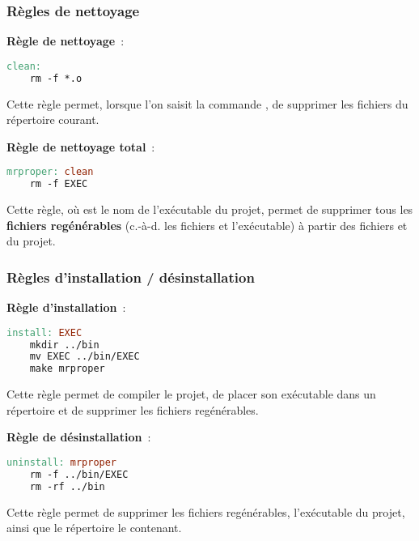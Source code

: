 \begin{frame}[fragile]
\frametitle{Règles de nettoyage}
{\bf Règle de nettoyage}~:
\begin{multicols}{2}
\begin{lstlisting}[language=make]
clean:
    rm -f *.o
\end{lstlisting}
Cette règle permet, lorsque l'on saisit la commande ,
de supprimer les fichiers  du répertoire courant.
\end{multicols}
\bigskip
\bigskip

{\bf Règle de nettoyage total}~:
\begin{multicols}{2}
\begin{lstlisting}[language=make]
mrproper: clean
    rm -f EXEC
\end{lstlisting}
Cette règle,
où  est le nom de l'exécutable du projet, permet de supprimer
tous les {\bf fichiers regénérables} (c.-à-d. les fichiers  et
l'exécutable) à partir des fichiers  et  du projet.
\end{multicols}
\end{frame}

\begin{frame}[fragile]
\frametitle{Règles d'installation / désinstallation}

{\bf Règle d'installation}~:
\begin{multicols}{2}
\begin{lstlisting}[language=make]
install: EXEC
    mkdir ../bin
    mv EXEC ../bin/EXEC
    make mrproper
\end{lstlisting}
Cette règle permet de compiler le projet, de placer son exécutable
 dans un répertoire  et de supprimer les fichiers
regénérables.
\end{multicols}
\bigskip
\bigskip

{\bf Règle de désinstallation}~:
\begin{multicols}{2}
\begin{lstlisting}[language=make]
uninstall: mrproper
    rm -f ../bin/EXEC
    rm -rf ../bin
\end{lstlisting}
Cette règle permet de supprimer les fichiers regénérables,
l'exécutable du projet, ainsi que le répertoire  le contenant.
\end{multicols}
\end{frame}

